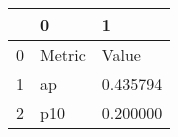 \begin{tabular}{lll}
\toprule
 & 0 & 1 \\
\midrule
0 & Metric & Value \\
1 & ap & 0.435794 \\
2 & p10 & 0.200000 \\
\bottomrule
\end{tabular}
